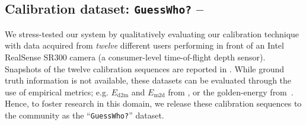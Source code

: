 \subsection{Calibration dataset: \texttt{GuessWho?} -- } 
\label{sec:evaldataset}
We stress-tested our system by qualitatively evaluating our calibration technique with data acquired from \emph{twelve} different users performing in front of an Intel RealSense SR300 camera (a consumer-level time-of-flight depth sensor). Snapshots of the twelve calibration sequences are reported in .
While ground truth information is not available, these datasets can be evaluated through the use of empirical metrics; e.g. $E_\text{d2m}$ and $E_\text{m2d}$ from \cite{tkach2016sphere}, or the golden-energy from~\cite{taylor2016joint}.
Hence, to foster research in this domain, we release these calibration sequences to the community as the ``\texttt{GuessWho?}'' dataset.


